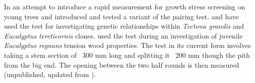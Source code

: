 In an attempt to introduce a rapid measurement for growth stress screening on young trees \cite{Chauhan_2010} and \cite{Entwistle_2014} introduced and tested a variant of the pairing test. \cite{naranjo2012early} and \cite{Aggarwal_2013} have used the test for investigating genetic relationships within \textit{Tectona grandis} and \textit{Eucalyptus tereticornis} clones. \cite{Chauhan_2011} used the test during an investigation of juvenile \textit{Eucalyptus regnans} tension wood properties. The test in its current form involves taking a stem section of ~300 mm long and splitting it ~200 mm though the pith from the big end. The opening between the two half rounds is then measured (unpublished, updated from \cite{Chauhan_2011}).  